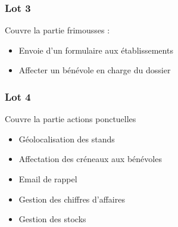 \begin{frame}
	\frametitle{Lot 3}
	Couvre la partie frimousses :
	\begin{itemize}
		\item Envoie d'un formulaire aux établissements
		\item Affecter un bénévole en charge du dossier
	\end{itemize}
\end{frame}


\begin{frame}
	\frametitle{Lot 4}
	Couvre la partie actions ponctuelles
	\begin{itemize}
		\item Géolocalisation des stands
		\item Affectation des créneaux aux bénévoles
		\item Email de rappel
		\item Gestion des chiffres d'affaires
		\item Gestion des stocks
	\end{itemize}
\end{frame}